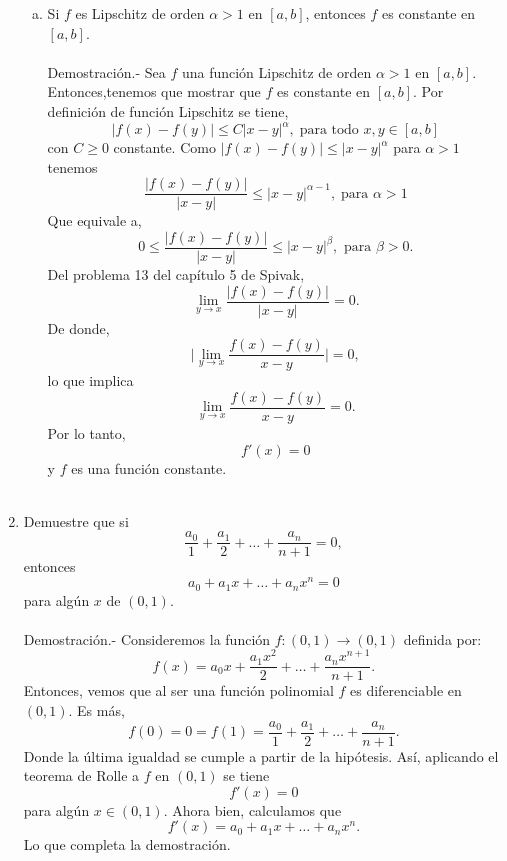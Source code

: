 \begin{enumerate}[\bfseries 1.]
\begin{enumerate}[(a)]
	    \item Si $f$ es Lipschitz de orden $\alpha>1$ en $[a,b]$, entonces $f$ es constante en $[a,b]$.\\\\
		Demostración.-\; Sea $f$ una función Lipschitz de orden $\alpha>1$ en $[a,b]$. Entonces,tenemos que mostrar que $f$ es constante en $[a,b]$. Por definición de función Lipschitz se tiene,
		$$|f(x)-f(y)|\leq C|x-y|^\alpha, \; \mbox{para todo }x,y\in[a,b]$$
		con $C\geq 0$ constante. Como $|f(x)-f(y)|\leq |x-y|^{\alpha}$ para $\alpha>1$ tenemos
		$$\dfrac{|f(x)-f(y)|}{|x-y|}\leq |x-y|^{\alpha-1},\; \mbox{para } \alpha>1$$
		Que equivale a,
		$$0\leq \dfrac{|f(x)-f(y)|}{|x-y|}\leq |x-y|^\beta,\mbox{ para }\beta>0.$$
		Del problema 13 del capítulo 5 de Spivak, 
		$$\lim_{y\to x}\dfrac{|f(x)-f(y)|}{|x-y|}=0.$$
		De donde,
		$$\bigg|\lim_{y\to x}\dfrac{f(x)-f(y)}{x-y}\bigg|=0,$$
		lo que implica
		$$\lim_{y\to x}\dfrac{f(x)-f(y)}{x-y}=0.$$
		Por lo tanto, 
		$$f'(x)=0$$
		y $f$ es una función constante.\\\\

	\end{enumerate}

    \item Demuestre que si
    $$\dfrac{a_0}{1}+\dfrac{a_1}{2}+\ldots+\dfrac{a_n}{n+1}=0,$$
    entonces
    $$a_0+a_1x+\ldots + a_n x^n = 0$$
    para algún $x$ de $(0,1)$.\\\\
	Demostración.-\; Consideremos la función $f:(0,1)\to (0,1)$ definida por:
	$$f(x)=a_0x+\dfrac{a_1x^2}{2}+\ldots+\dfrac{a_nx^{n+1}}{n+1}.$$
	Entonces, vemos que al ser una función polinomial $f$ es diferenciable en $(0,1)$. Es más,
	$$f(0)=0=f(1)=\dfrac{a_0}{1}+\dfrac{a_1}{2}+\ldots + \dfrac{a_n}{n+1}.$$
	Donde la última igualdad se cumple a partir de la hipótesis. Así, aplicando el teorema de Rolle a $f$ en $(0,1)$ se tiene
	$$f'(x)=0$$
	para algún $x\in(0,1)$. Ahora bien, calculamos que
	$$f'(x)=a_0+a_1x+\ldots + a_n x^n.$$
	Lo que completa la demostración.\\\\


\end{enumerate}
